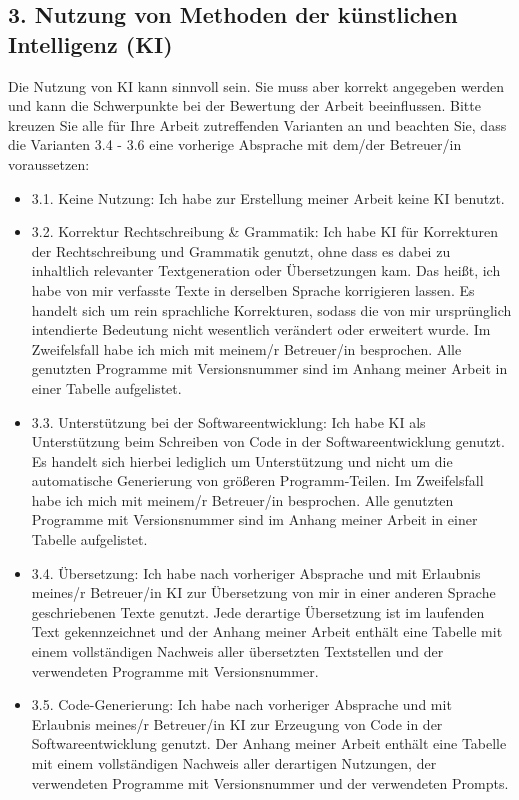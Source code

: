 {        \subsection*{3. Nutzung von Methoden der künstlichen Intelligenz (KI)}
        Die Nutzung von KI kann sinnvoll sein. Sie muss aber korrekt angegeben werden und kann die Schwerpunkte bei der Bewertung der Arbeit beeinflussen. Bitte kreuzen Sie alle für Ihre Arbeit zutreffenden Varianten an und beachten Sie, dass die Varianten 3.4 - 3.6 eine vorherige Absprache mit dem/der Betreuer/in voraussetzen:
        \begin{itemize}
            \item[$\square$] 3.1. Keine Nutzung: Ich habe zur Erstellung meiner Arbeit keine KI benutzt.
            \item[$\square$] 3.2. Korrektur Rechtschreibung \& Grammatik: Ich habe KI für Korrekturen der Rechtschreibung und Grammatik genutzt, ohne dass es dabei zu inhaltlich relevanter Textgeneration oder Übersetzungen kam. Das heißt, ich habe von mir verfasste Texte in derselben Sprache korrigieren lassen. Es handelt sich um rein sprachliche Korrekturen, sodass die von mir ursprünglich intendierte Bedeutung nicht wesentlich verändert oder erweitert wurde. Im Zweifelsfall habe ich mich mit meinem/r Betreuer/in besprochen. Alle genutzten Programme mit Versionsnummer sind im Anhang meiner Arbeit in einer Tabelle aufgelistet.
            \item[$\square$] 3.3. Unterstützung bei der Softwareentwicklung: Ich habe KI als Unterstützung beim Schreiben von Code in der Softwareentwicklung genutzt. Es handelt sich hierbei lediglich um Unterstützung und nicht um die automatische Generierung von größeren Programm-Teilen. Im Zweifelsfall habe ich mich mit meinem/r Betreuer/in besprochen. Alle genutzten Programme mit Versionsnummer sind im Anhang meiner Arbeit in einer Tabelle aufgelistet.
            \item[$\square$] 3.4. Übersetzung: Ich habe nach vorheriger Absprache und mit Erlaubnis meines/r Betreuer/in KI zur Übersetzung von mir in einer anderen Sprache geschriebenen Texte genutzt. Jede derartige Übersetzung ist im laufenden Text gekennzeichnet und der Anhang meiner Arbeit enthält eine Tabelle mit einem vollständigen Nachweis aller übersetzten Textstellen und der verwendeten Programme mit Versionsnummer.
            \item[$\square$] 3.5. Code-Generierung: Ich habe nach vorheriger Absprache und mit Erlaubnis meines/r Betreuer/in KI zur Erzeugung von Code in der Softwareentwicklung genutzt. Der Anhang meiner Arbeit enthält eine Tabelle mit einem vollständigen Nachweis aller derartigen Nutzungen, der verwendeten Programme mit Versionsnummer und der verwendeten Prompts.

\end{itemize}}
